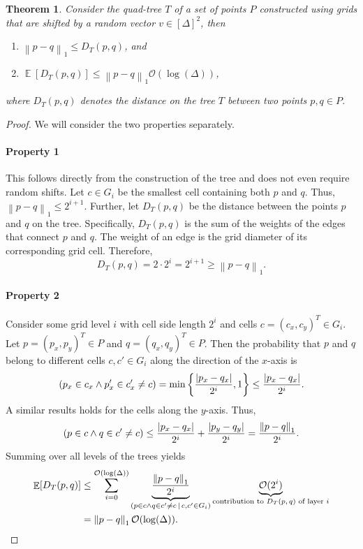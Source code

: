 \documentclass[11pt]{article}
\DeclareMathOperator*{\E}{\mathbb{E}}
\let\Pr\relax
\DeclareMathOperator*{\Pr}{\mathbb{P}}
\renewcommand{\O}{\mathcal{O}}
\newcommand{\norm}[1]{\left\lVert {#1} \right\rVert}
\newcommand{\abs}[1]{\left\lvert {#1} \right\rvert}
\newtheorem{theorem}{Theorem}
\begin{document}
\begin{theorem} \label{thm:quadtree}
	Consider the quad-tree $T$ of a set of points $P$ constructed using grids that are shifted by a random vector $v \in [\Delta]^2$, then
	\begin{enumerate}
		\item \label{thm:quadtree1}
		$\norm{p - q}_1 \le D_T(p,q)$, and
		\item 
		$\E[D_T(p,q)]  \le \norm{p -q}_1 \O(\log(\Delta))$,
	\end{enumerate}
where $D_T(p,q)$ denotes the distance on the tree $T$ between two points $p,q \in P$.
\end{theorem}
\begin{proof}
We will consider the two properties separately. 

\paragraph{Property 1}
This follows directly from the construction of the tree and does not even require random shifts. Let $c \in G_i$ be the smallest cell containing both $p$ and $q$. Thus, $\norm{p - q}_1 \le 2^{i+1}$. Further, let $D_T(p,q)$ be the distance between the points $p$ and $q$ on the tree. Specifically, $D_T(p,q)$ is the sum of the weights of the edges that connect $p$ and $q$. The weight of an edge is the grid diameter of its corresponding grid cell. Therefore, 
\begin{equation*}
	D_T(p,q) = 2 \cdot 2^i = 2^{i+1} \ge \norm{p - q}_1.
\end{equation*}

\paragraph{Property 2}
Consider some grid level $i$ with cell side length $2^i$ and cells $c = (c_x,c_y)^T \in G_i$. Let $p = (p_x, p_y)^T \in P$ and $q = (q_x,q_y)^T \in P$. Then the probability that $p$ and $q$ belong to different cells $c,c' \in G_i$ along the direction of the $x$-axis is
\begin{equation*}
	\Pr (p_x \in c_x \land p'_x \in c_x' \neq c) = \min \left\{ \frac{\abs{p_x - q_x}}{2^i}, 1 \right\} \le \frac{\abs{p_x - q_x}}{2^i}.
\end{equation*}
A similar results holds for the cells along the $y$-axis. Thus, 
\begin{equation*}
	\Pr(p \in c \land q \in c' \neq c) \le \frac{\abs{p_x - q_x}}{2^i} + \frac{\abs{p_y - q_y}}{2^i} = \frac{\norm{p -q}_1}{2^i}.
\end{equation*}
Summing over all levels of the trees yields
\begin{align*}
	\E[D_T(p,q)]
	& \le \sum_{i=0}^{\O(\log(\Delta))} \underbrace{\frac{\norm{p -q}_1}{2^i}}_{\Pr(p \in c \land q \in c' \neq c \, \lvert \, c, c' \in G_i)} \underbrace{\O(2^i)}_{\text{contribution to $D_T(p,q)$ of layer $i$}} \\
	& = \norm{p - q}_1 \O(\log(\Delta)).
\end{align*}

\end{proof}
\end{document}
